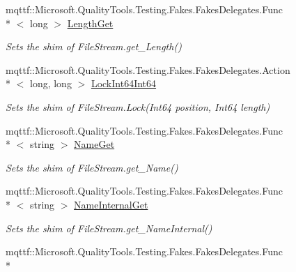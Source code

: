 \begin{DoxyCompactItemize}
mqttf\-::\-Microsoft.\-Quality\-Tools.\-Testing.\-Fakes.\-Fakes\-Delegates.\-Func\\*
$<$ long $>$ \hyperlink{class_system_1_1_i_o_1_1_fakes_1_1_shim_file_stream_a98a9acadd3e4cbab8951e7d6e5469a85}{Length\-Get}
\begin{DoxyCompactList}\small\item\em Sets the shim of File\-Stream.\-get\-\_\-\-Length()\end{DoxyCompactList}\item 
mqttf\-::\-Microsoft.\-Quality\-Tools.\-Testing.\-Fakes.\-Fakes\-Delegates.\-Action\\*
$<$ long, long $>$ \hyperlink{class_system_1_1_i_o_1_1_fakes_1_1_shim_file_stream_aa183af382ac41f7d23405ce2731515e7}{Lock\-Int64\-Int64}
\begin{DoxyCompactList}\small\item\em Sets the shim of File\-Stream.\-Lock(\-Int64 position, Int64 length)\end{DoxyCompactList}\item 
mqttf\-::\-Microsoft.\-Quality\-Tools.\-Testing.\-Fakes.\-Fakes\-Delegates.\-Func\\*
$<$ string $>$ \hyperlink{class_system_1_1_i_o_1_1_fakes_1_1_shim_file_stream_a1be1b880f0250e6f71d978f117fdf081}{Name\-Get}
\begin{DoxyCompactList}\small\item\em Sets the shim of File\-Stream.\-get\-\_\-\-Name()\end{DoxyCompactList}\item 
mqttf\-::\-Microsoft.\-Quality\-Tools.\-Testing.\-Fakes.\-Fakes\-Delegates.\-Func\\*
$<$ string $>$ \hyperlink{class_system_1_1_i_o_1_1_fakes_1_1_shim_file_stream_ad56ed78010c27dabf376829c988776aa}{Name\-Internal\-Get}
\begin{DoxyCompactList}\small\item\em Sets the shim of File\-Stream.\-get\-\_\-\-Name\-Internal()\end{DoxyCompactList}\item 
mqttf\-::\-Microsoft.\-Quality\-Tools.\-Testing.\-Fakes.\-Fakes\-Delegates.\-Func\\*

\end{DoxyCompactItemize}
